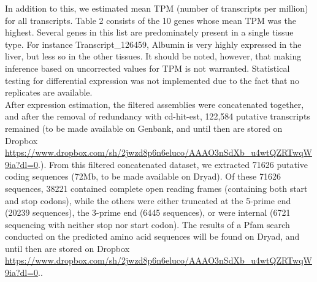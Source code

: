 \documentclass[12pt]{article}
\begin{document}
In addition to this, we estimated mean TPM (number of transcripts per million) for all transcripts. {\hypertarget{Table 2}{Table 2}} consists of the 10 genes whose mean TPM was the highest. Several genes in this list are predominately  present in a single tissue type. For instance Transcript\_126459, Albumin is very highly expressed in the liver, but less so in the other tissues. It should be noted, however, that making inference based on uncorrected values for TPM is not warranted. Statistical testing for differential expression was not implemented due to the fact that no replicates are available.  \\  

After expression estimation, the filtered assemblies were concatenated together, and after the removal of redundancy with cd-hit-est, 122,584 putative transcripts remained (to be made available on Genbank, and until then are stored on Dropbox \url{https://www.dropbox.com/sh/2jwzd8p6n6eluco/AAAO3nSdXb_u4wtQZRTwqW9ia?dl=0}.). From this filtered concatenated dataset, we extracted 71626 putative coding sequences (72Mb, to be made available on Dryad). Of these 71626 sequences, 38221 contained complete open reading frames (containing both start and stop codons), while the others were either truncated at the 5-prime end (20239 sequences), the 3-prime end (6445 sequences), or were internal (6721 sequencing with neither stop nor start codon). The results of a Pfam search conducted on the predicted amino acid sequences will be found on Dryad, and until then are stored on Dropbox \url{https://www.dropbox.com/sh/2jwzd8p6n6eluco/AAAO3nSdXb_u4wtQZRTwqW9ia?dl=0}.. \\
\end{document}
